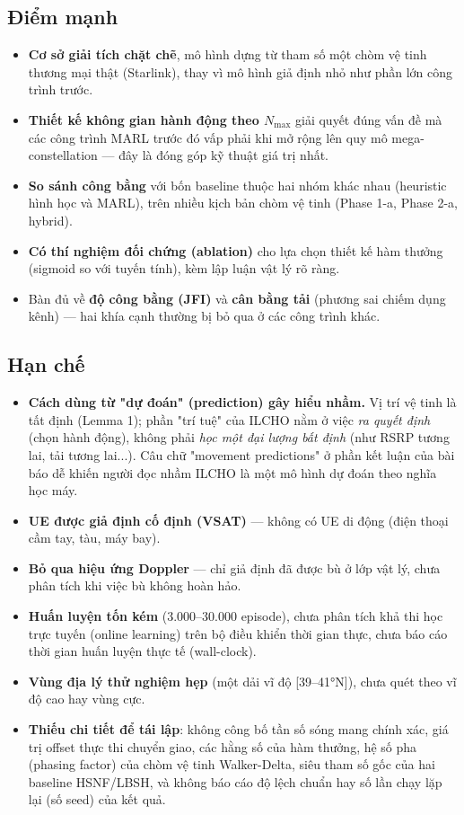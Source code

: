 \documentclass{article} %
\begin{document}
\subsection{Điểm mạnh}
\begin{itemize}
    \item \textbf{Cơ sở giải tích chặt chẽ}, mô hình dựng từ tham số một chòm vệ tinh thương mại thật (Starlink), thay vì mô hình giả định nhỏ như phần lớn công trình trước.
    \item \textbf{Thiết kế không gian hành động theo $N_{\max}$} giải quyết đúng vấn đề mà các công trình MARL trước đó vấp phải khi mở rộng lên quy mô mega-constellation — đây là đóng góp kỹ thuật giá trị nhất.
    \item \textbf{So sánh công bằng} với bốn baseline thuộc hai nhóm khác nhau (heuristic hình học và MARL), trên nhiều kịch bản chòm vệ tinh (Phase 1-a, Phase 2-a, hybrid).
    \item \textbf{Có thí nghiệm đối chứng (ablation)} cho lựa chọn thiết kế hàm thưởng (sigmoid so với tuyến tính), kèm lập luận vật lý rõ ràng.
    \item Bàn đủ về \textbf{độ công bằng (JFI)} và \textbf{cân bằng tải} (phương sai chiếm dụng kênh) — hai khía cạnh thường bị bỏ qua ở các công trình khác.
\end{itemize}

\subsection{Hạn chế}
\begin{itemize}
    \item \textbf{Cách dùng từ "dự đoán" (prediction) gây hiểu nhầm.} Vị trí vệ tinh là tất định (Lemma 1); phần "trí tuệ" của ILCHO nằm ở việc \emph{ra quyết định} (chọn hành động), không phải \emph{học một đại lượng bất định} (như RSRP tương lai, tải tương lai...). Câu chữ "movement predictions" ở phần kết luận của bài báo dễ khiến người đọc nhầm ILCHO là một mô hình dự đoán theo nghĩa học máy.
    \item \textbf{UE được giả định cố định (VSAT)} — không có UE di động (điện thoại cầm tay, tàu, máy bay).
    \item \textbf{Bỏ qua hiệu ứng Doppler} — chỉ giả định đã được bù ở lớp vật lý, chưa phân tích khi việc bù không hoàn hảo.
    \item \textbf{Huấn luyện tốn kém} (3.000--30.000 episode), chưa phân tích khả thi học trực tuyến (online learning) trên bộ điều khiển thời gian thực, chưa báo cáo thời gian huấn luyện thực tế (wall-clock).
    \item \textbf{Vùng địa lý thử nghiệm hẹp} (một dải vĩ độ [39--41°N]), chưa quét theo vĩ độ cao hay vùng cực.
    \item \textbf{Thiếu chi tiết để tái lập}: không công bố tần số sóng mang chính xác, giá trị offset thực thi chuyển giao, các hằng số của hàm thưởng, hệ số pha (phasing factor) của chòm vệ tinh Walker-Delta, siêu tham số gốc của hai baseline HSNF/LBSH, và không báo cáo độ lệch chuẩn hay số lần chạy lặp lại (số seed) của kết quả.
\end{itemize}
\end{document}
